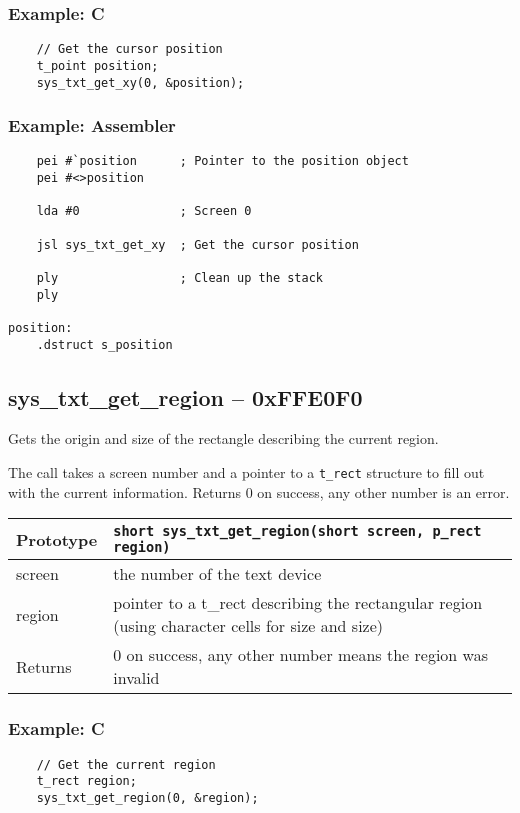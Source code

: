 \subsubsection*{Example: C}
\begin{lstlisting}
    // Get the cursor position
    t_point position;
    sys_txt_get_xy(0, &position);
\end{lstlisting}

\subsubsection*{Example: Assembler}
\begin{verbatim}
    pei #`position      ; Pointer to the position object
    pei #<>position

    lda #0              ; Screen 0

    jsl sys_txt_get_xy  ; Get the cursor position

    ply                 ; Clean up the stack
    ply

position:
    .dstruct s_position
\end{verbatim}


\subsection*{sys\_txt\_get\_region -- 0xFFE0F0}
Gets the origin and size of the rectangle describing the current region.

The call takes a screen number and a pointer to a \verb+t_rect+ structure to fill out with the current information. Returns 0 on success, any other number is an error.

\bigskip

\begin{tabular}{|l||l|} \hline
Prototype & \lstinline!short sys_txt_get_region(short screen, p_rect region)! \\ \hline
screen & the number of the text device \\ \hline
region & pointer to a t\_rect describing the rectangular region (using character cells for size and size) \\ \hline
Returns & 0 on success, any other number means the region was invalid \\ \hline
\end{tabular}

\subsubsection*{Example: C}
\begin{lstlisting}
    // Get the current region
    t_rect region;
    sys_txt_get_region(0, &region);
\end{lstlisting}

